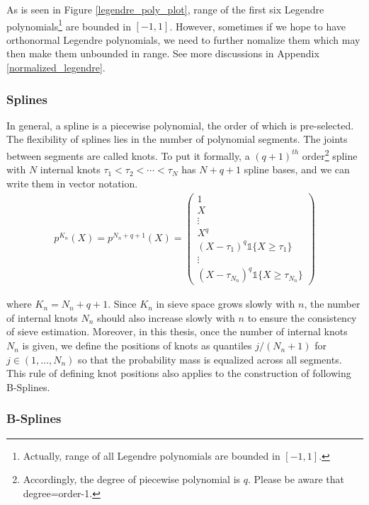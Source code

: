 \documentclass[12pt, a4paper]{article}
\theoremstyle{MAstyle} \newtheorem{assumption}{Assumption}[section]
\theoremstyle{MAstyle} \newtheorem{definition}{Definition}[section]
\theoremstyle{MAstyle} \newtheorem{theorem}{Theorem}[section]
\theoremstyle{MAstyle} \newtheorem{corollary}{Corollary}[section]
\begin{document}
        As is seen in Figure \ref{legendre_poly_plot}, range of the first six Legendre polynomials\footnote{Actually, range of all Legendre polynomials are bounded in $[-1,1]$.} are bounded in $[-1,1]$. However, sometimes if we hope to have orthonormal Legendre polynomials, we need to further nomalize them which may then make them unbounded in range. See more discussions in Appendix \ref{normalized_legendre}. 

        \subsubsection{Splines}\label{splines}

        In general, a spline is a piecewise polynomial, the order of which is pre-selected. The flexibility of splines lies in the number of polynomial segments. The joints between segments are called knots. To put it formally, a $(q+1)^{th}$ order\footnote{Accordingly, the degree of piecewise polynomial is $q$. Please be aware that degree=order-1.} spline with $N$ internal knots $\tau_1 < \tau_2 < \cdots < \tau_N$ has $N+q+1$ spline bases, and we can write them in vector notation.
        \begin{align}
            p^{K_n}(X)=p^{N_n+q+1}(X)=
            \begin{pmatrix}
                1  \\
                X  \\
                \vdots \\
                X^q\\
                (X-\tau_1)^q \mathds{1}\{X \ge \tau_1\}  \\
                \vdots  \\
                (X-\tau_{N_n})^q \mathds{1}\{X \ge \tau_{N_n}\}
            \end{pmatrix} 
        \end{align}

        where $K_n=N_n+q+1$. Since $K_n$ in sieve space grows slowly with $n$, the number of internal knots $N_n$ should also increase slowly with $n$ to ensure the consistency of sieve estimation. Moreover, in this thesis, once the number of internal knots $N_n$ is given, we define the positions of knots as quantiles $j/(N_n+1)$ for $j \in (1, \ldots, N_n)$ so that the probability mass is equalized across all segments. This rule of defining knot positions also applies to the construction of following B-Splines.

        \subsubsection{B-Splines}\label{b-splines}
\end{document}
